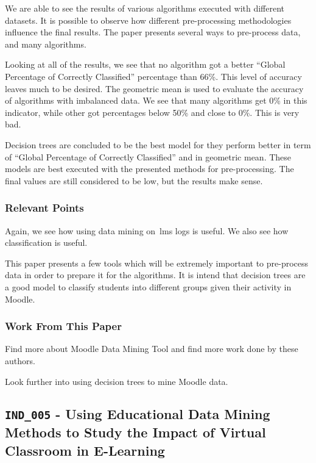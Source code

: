 We are able to see the results of various algorithms executed with different
datasets. It is possible to observe how different pre-processing methodologies
influence the final results. The paper presents several ways to pre-process
data, and many algorithms.

Looking at all of the results, we see that no algorithm got a better ``Global
Percentage of Correctly Classified'' percentage than 66\%. This level of
accuracy leaves much to be desired. The geometric mean is used to evaluate the
accuracy of algorithms with imbalanced data. We see that many algorithms get
0\% in this indicator, while other got percentages below 50\% and close to 0\%.
This is very bad.

Decision trees are concluded to be the best model for they perform better in
term of ``Global Percentage of Correctly Classified'' and in geometric mean.
These models are best executed with the presented methods for pre-processing.
The final values are still considered to be low, but the results make sense.

\subsubsection{Relevant Points}

Again, we see how using data mining on~\gls{lms} logs is useful. We also see
how classification is useful.

This paper presents a few tools which will be extremely important to
pre-process data in order to prepare it for the algorithms. It is intend that
decision trees are a good model to classify students into different groups
given their activity in Moodle.

\subsubsection{Work From This Paper}

Find more about Moodle Data Mining Tool and find more work done by these
authors.

Look further into using decision trees to mine Moodle data.

\subsection{\texttt{IND\_005} - Using Educational Data Mining Methods to Study the
Impact of Virtual Classroom in E-Learning}

